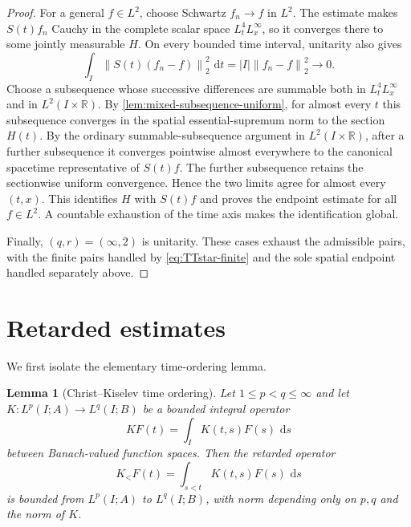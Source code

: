 \documentclass[11pt,oneside]{book}
\newtheorem{lemma}[theorem]{Lemma}
\theoremstyle{definition}
\theoremstyle{remark}
\newcommand{\R}{\mathbb R}
\newcommand{\1}{\mathbf 1}
\newcommand{\dd}{\,\mathrm d}
\newcommand{\norm}[1]{\left\lVert #1\right\rVert}
\begin{document}
\begin{proof}
For a general $f\in L^2$, choose Schwartz $f_n\to f$ in $L^2$.  The estimate
makes $S(t)f_n$ Cauchy in the complete scalar space
$L^4_tL^\infty_x$, so it converges there to some jointly measurable $H$.
On every bounded time interval, unitarity also gives
\[
 \int_I\norm{S(t)(f_n-f)}_2^2\,\dd t
 =|I|\norm{f_n-f}_2^2\longrightarrow0.
\]
Choose a subsequence whose successive differences are summable both in
$L^4_tL^\infty_x$ and in $L^2(I\times\R)$.  By
\cref{lem:mixed-subsequence-uniform}, for almost every $t$ this subsequence
converges in the spatial essential-supremum norm to the section $H(t)$.  By
the ordinary summable-subsequence argument in $L^2(I\times\R)$, after a
further subsequence it converges pointwise almost everywhere to the canonical
spacetime representative of $S(t)f$.  The further subsequence retains the
sectionwise uniform convergence.  Hence the two limits agree for almost every
$(t,x)$.  This identifies $H$ with $S(t)f$ and proves the endpoint estimate
for all $f\in L^2$.  A countable exhaustion of the time axis makes the
identification global.

Finally, $(q,r)=(\infty,2)$ is unitarity.  These cases exhaust the admissible
pairs, with the finite pairs handled by \eqref{eq:TTstar-finite} and the sole
spatial endpoint handled separately above.
\end{proof}

\section{Retarded estimates}
We first isolate the elementary time-ordering lemma.

\begin{lemma}[Christ--Kiselev time ordering]\label{lem:CK}
Let $1\le p<q\le\infty$ and let
$K:L^p(I;A)\to L^q(I;B)$ be a bounded integral operator
\[
 KF(t)=\int_I K(t,s)F(s)\,\dd s
\]
between Banach-valued function spaces.  Then the retarded operator
\[
 K_{<}F(t)=\int_{s<t}K(t,s)F(s)\,\dd s
\]
is bounded from $L^p(I;A)$ to $L^q(I;B)$, with norm depending only on
$p,q$ and the norm of $K$.
\end{lemma}
\end{document}
